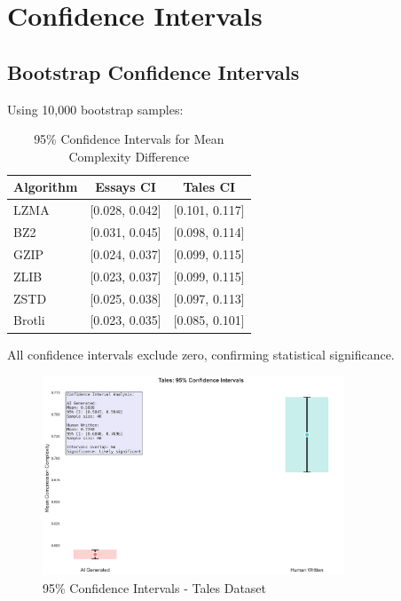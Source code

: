 \documentclass[12pt,a4paper]{report}
\begin{document}
\section{Confidence Intervals}

\subsection{Bootstrap Confidence Intervals}

Using 10,000 bootstrap samples:

\begin{table}[h]
\centering
\caption{95\% Confidence Intervals for Mean Complexity Difference}
\begin{tabular}{lcc}
\toprule
\textbf{Algorithm} & \textbf{Essays CI} & \textbf{Tales CI} \\
\midrule
LZMA & [0.028, 0.042] & [0.101, 0.117] \\
BZ2 & [0.031, 0.045] & [0.098, 0.114] \\
GZIP & [0.024, 0.037] & [0.099, 0.115] \\
ZLIB & [0.023, 0.037] & [0.099, 0.115] \\
ZSTD & [0.025, 0.038] & [0.097, 0.113] \\
Brotli & [0.023, 0.035] & [0.085, 0.101] \\
\bottomrule
\end{tabular}
\end{table}

All confidence intervals exclude zero, confirming statistical significance.

\begin{figure}[h]
\centering
\includegraphics[width=0.8\textwidth]{figures/tales_visualizations/08_confidence_intervals.png}
\caption{95\% Confidence Intervals - Tales Dataset}
\label{fig:confidence_tales}
\end{figure}
\end{document}
